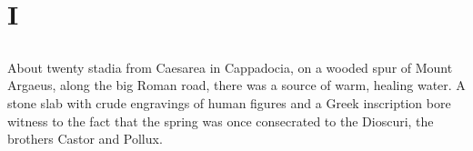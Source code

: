 \part*{I}

\chapter{} %

About twenty stadia from Caesarea in Cappadocia, on a wooded spur of
Mount Argaeus, along the big Roman road, there was a source of warm,
healing water. A stone slab with crude engravings of human figures and
a Greek inscription bore witness to the fact that the spring was once
consecrated to the Dioscuri, the brothers Castor and Pollux. 